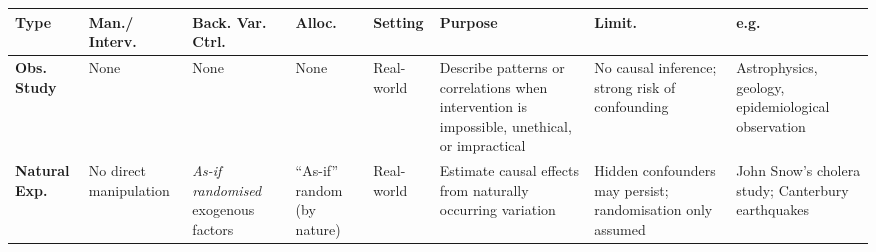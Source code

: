 \documentclass[
  12pt,
]{book}
\begin{document}
\begin{longtable}[]{@{}
  >{\raggedright\arraybackslash}p{}
  >{\raggedright\arraybackslash}p{}
  >{\raggedright\arraybackslash}p{}
  >{\raggedright\arraybackslash}p{}
  >{\raggedright\arraybackslash}p{}
  >{\raggedright\arraybackslash}p{}
  >{\raggedright\arraybackslash}p{}
  >{\raggedright\arraybackslash}p{}@{}}
\toprule\noalign{}
\begin{minipage}[b]{\linewidth}\raggedright
\textbf{Type}
\end{minipage} & \begin{minipage}[b]{\linewidth}\raggedright
\textbf{Man./ Interv.}
\end{minipage} & \begin{minipage}[b]{\linewidth}\raggedright
\textbf{Back. Var. Ctrl.}
\end{minipage} & \begin{minipage}[b]{\linewidth}\raggedright
\textbf{Alloc.}
\end{minipage} & \begin{minipage}[b]{\linewidth}\raggedright
\textbf{Setting}
\end{minipage} & \begin{minipage}[b]{\linewidth}\raggedright
\textbf{Purpose}
\end{minipage} & \begin{minipage}[b]{\linewidth}\raggedright
\textbf{Limit.}
\end{minipage} & \begin{minipage}[b]{\linewidth}\raggedright
\textbf{e.g.}
\end{minipage} \\
\midrule\noalign{}
\endhead
\bottomrule\noalign{}
\endlastfoot
\textbf{Obs. Study} & None & None & None & Real-world & Describe patterns or correlations when intervention is impossible, unethical, or impractical & No causal inference; strong risk of confounding & Astrophysics, geology, epidemiological observation \\
\textbf{Natural Exp.} & No direct manipulation & \emph{As-if randomised} exogenous factors & ``As-if'' random (by nature) & Real-world & Estimate causal effects from naturally occurring variation & Hidden confounders may persist; randomisation only assumed & John Snow's cholera study; Canterbury earthquakes \\

\end{longtable}
\end{document}
